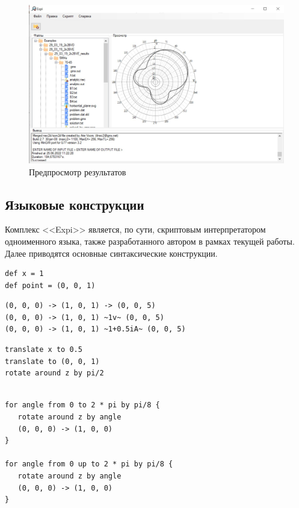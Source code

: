 \begin{figure}[h!]
  \centering
  \includegraphics[width=\linewidth]{expi_results.jpeg}
  \caption{Предпросмотр результатов}
  \label{ic:applic_b_results}
\end{figure}

\subsection*{Языковые конструкции}
Комплекс <<Expi>> является, по сути, скриптовым интерпретатором одноименного языка, также разработанного автором в рамках текущей работы. Далее приводятся основные синтаксические конструкции.

\begin{lstlisting}[caption={Переменные}, label={experiment}]
def x = 1
def point = (0, 0, 1)
\end{lstlisting}

\begin{lstlisting}[caption={Сегментированный провод}, label={experiment}]
(0, 0, 0) -> (1, 0, 1) -> (0, 0, 5)
(0, 0, 0) -> (1, 0, 1) ~1v~ (0, 0, 5)
(0, 0, 0) -> (1, 0, 1) ~1+0.5iA~ (0, 0, 5)
\end{lstlisting}

\begin{lstlisting}[caption={Линейные преобразования}, label={experiment}]
translate x to 0.5
translate to (0, 0, 1)
rotate around z by pi/2
\end{lstlisting}

\begin{lstlisting}[caption={Циклы}, label={experiment}]

for angle from 0 to 2 * pi by pi/8 {
   rotate around z by angle
   (0, 0, 0) -> (1, 0, 0)
}

for angle from 0 up to 2 * pi by pi/8 {
   rotate around z by angle
   (0, 0, 0) -> (1, 0, 0)
}

\end{lstlisting}


